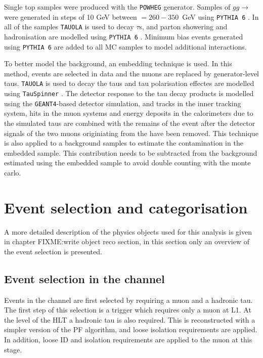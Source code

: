 Single top samples were produced with the \texttt{POWHEG} \cite{powheg1,powheg2} generator. Samples of $gg\rightarrow$\Htohhtobbtautau
were generated in steps of 10 GeV between \mH $= 260 - 350$~GeV using \texttt{PYTHIA 6} \cite{pythia64}. In all of the samples
\texttt{TAUOLA} \cite{tauola} is used to decay $\tau$s, and parton showering and hadronisation are modelled using \texttt{PYTHIA 6} \cite{pythia64}.
Minimum bias events generated using \texttt{PYTHIA 6} are added to all \ac{MC} samples to model additional
interactions. 

To better model the \Ztautau background, an embedding technique is used. In this method, 
\Zmm events are selected in data and the muons are replaced by generator-level taus. \texttt{TAUOLA} is used
to decay the taus and tau polarisation effectes are modelled using \texttt{TauSpinner} \cite{TauSpinner}. The detector
response to the tau decay products is modelled using the \texttt{GEANT4}-based \cite{Geant4} detector simulation, and 
tracks in the inner tracking system, hits in the muon systems and energy deposits in the calorimeters
due to the simulated taus are combined with the remains of the \Zmm event after the detector signals
of the two muons originiating from the \PZ have been removed. This technique is also applied to 
a \ttbar background samples to estimate the \ttbar contamination in the embedded sample. This contribution
needs to be subtracted from the \Ztautau background estimated using the embedded \Zmm sample to
avoid double counting with the \ttbar monte carlo.


\section{Event selection and categorisation}
\label{sec:hhh_selection}
A more detailed description of the physics objects used for this analysis is given in chapter FIXME:write object reco section, 
in this section only an overview of the event selection is presented.

\subsection{\texorpdfstring{Event selection in the \mutau channel}{Event selection in the mu-tau channel}}
\label{sec:hhh_selection_mutau}
Events in the \mutau channel are first selected by requiring a muon and a 
hadronic tau. The first step of this selection is a trigger which requires only a muon
at L1. At the level of the HLT a hadronic tau is also required. This is reconstructed
with a simpler version of the PF algorithm, and loose isolation requirements are 
applied. In addition, loose ID and isolation requirements are applied to the muon at 
this stage. 

